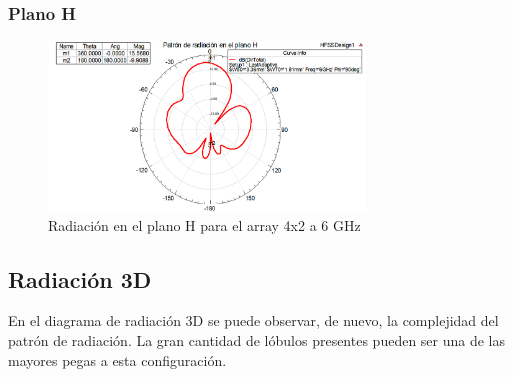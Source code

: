 \subsubsection{Plano H}
\begin{figure}[H]
    \centering
        \includegraphics[width=0.75\textwidth]{archivos/analisis/4x22/5}
        \caption{Radiación en el plano H para el array 4x2 a 6 GHz}
        \label{fig:H4x22}
\end{figure}

\subsection{Radiación 3D}
\par En el diagrama de radiación 3D se puede observar, de nuevo, la complejidad del patrón de radiación. La gran cantidad de lóbulos presentes pueden ser una de las mayores pegas a esta configuración.

